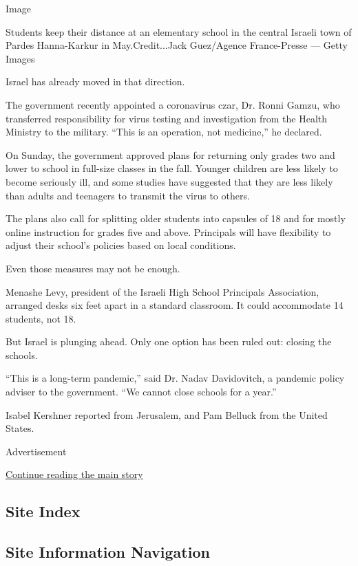 Image

Students keep their distance at an elementary school in the central
Israeli town of Pardes Hanna-Karkur in May.Credit...Jack Guez/Agence
France-Presse --- Getty Images

Israel has already moved in that direction.

The government recently appointed a coronavirus czar, Dr. Ronni Gamzu,
who transferred responsibility for virus testing and investigation from
the Health Ministry to the military. ``This is an operation, not
medicine,'' he declared.

On Sunday, the government approved plans for returning only grades two
and lower to school in full-size classes in the fall. Younger children
are less likely to become seriously ill, and some studies have suggested
that they are less likely than adults and teenagers to transmit the
virus to others.

The plans also call for splitting older students into capsules of 18 and
for mostly online instruction for grades five and above. Principals will
have flexibility to adjust their school's policies based on local
conditions.

Even those measures may not be enough.

Menashe Levy, president of the Israeli High School Principals
Association, arranged desks six feet apart in a standard classroom. It
could accommodate 14 students, not 18.

But Israel is plunging ahead. Only one option has been ruled out:
closing the schools.

``This is a long-term pandemic,'' said Dr. Nadav Davidovitch, a pandemic
policy adviser to the government. ``We cannot close schools for a
year.''

Isabel Kershner reported from Jerusalem, and Pam Belluck from the United
States.

Advertisement

\protect\hyperlink{after-bottom}{Continue reading the main story}

\hypertarget{site-index}{%
\subsection{Site Index}\label{site-index}}

\hypertarget{site-information-navigation}{%
\subsection{Site Information
Navigation}\label{site-information-navigation}}

